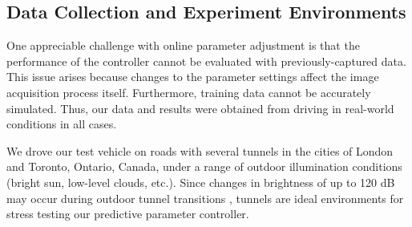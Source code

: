 \documentclass[letterpaper, 10pt, journal, twoside]{IEEEtran}
\begin{document}
\subsection{Data Collection and Experiment Environments}

One appreciable challenge with online parameter adjustment is that the performance of the controller cannot be evaluated with previously-captured data. 
This issue arises because changes to the parameter settings affect the image acquisition process itself.
Furthermore, training data cannot be accurately simulated.
Thus, our data and results were obtained from driving in real-world conditions in all cases.

We drove our test vehicle on roads with several tunnels in the cities of London and Toronto, Ontario, Canada, under a range of outdoor illumination conditions (bright sun, low-level clouds, etc.). 
Since changes in brightness of up to 120 dB may occur during outdoor tunnel transitions \cite{Westerhoff2015}, tunnels are ideal environments for stress testing our predictive parameter controller.
\end{document}
